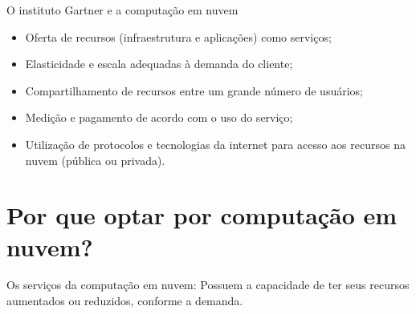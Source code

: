 \documentclass{beamer}
\begin{document}
\begin{frame}[fragile]{O instituto Gartner e a computação em nuvem}\justifying
      \begin{itemize}
            \item Oferta de recursos (infraestrutura e aplicações) como serviços;
            \item Elasticidade e escala adequadas à demanda do cliente;
            \item Compartilhamento de recursos entre um grande número de usuários;
            \item Medição e pagamento de acordo com o uso do serviço;
            \item Utilização de protocolos e tecnologias da internet para acesso aos recursos na nuvem (pública ou privada).
      \end{itemize}
\end{frame}

\section{Por que optar por computação em nuvem?}
\begin{frame}[fragile]{Os serviços da computação em nuvem:}\justifying
      Possuem a capacidade de ter seus recursos aumentados ou reduzidos, conforme a demanda.
\end{frame}
\end{document}

